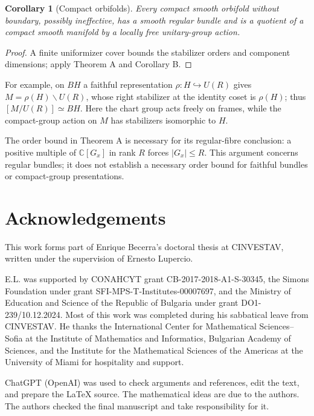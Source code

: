 \documentclass[11pt,a4paper,reqno]{amsart}
\numberwithin{equation}{section}
\newtheorem{corollary}[theorem]{Corollary}
\theoremstyle{remark}
\theoremstyle{plain}
\newcommand{\C}{\mathbb C}
\begin{document}
\begin{corollary}[Compact orbifolds]
Every compact smooth orbifold without boundary, possibly ineffective, has a
smooth regular bundle and is a quotient of a compact smooth manifold by a
locally free unitary-group action.
\end{corollary}

\begin{proof}
A finite uniformizer cover bounds the stabilizer orders and component
dimensions; apply Theorem A and Corollary B.
\end{proof}

For example, on $BH$ a faithful representation
$\rho:H\hookrightarrow U(R)$ gives $M=\rho(H)\backslash U(R)$, whose right
stabilizer at the identity coset is $\rho(H)$; thus
$[M/U(R)]\simeq BH$. Here the chart group acts freely on frames, while the compact-group action
on $M$ has stabilizers isomorphic to $H$.

The order bound in Theorem A is necessary for its regular-fibre conclusion:
a positive multiple of $\C[G_x]$ in rank $R$ forces $|G_x|\leq R$. This argument concerns regular bundles; it does not establish a necessary
order bound for faithful bundles or compact-group presentations.

\section*{Acknowledgements}
This work forms part of Enrique Becerra's doctoral thesis at CINVESTAV, written
under the supervision of Ernesto Lupercio.

E.L. was supported by CONAHCYT grant CB-2017-2018-A1-S-30345, the Simons
Foundation under grant SFI-MPS-T-Institutes-00007697, and the Ministry of
Education and Science of the Republic of Bulgaria under grant
DO1-239/10.12.2024. Most of this work was completed during his sabbatical leave
from CINVESTAV\@. He thanks the International Center for Mathematical
Sciences--Sofia at the Institute of Mathematics and Informatics, Bulgarian
Academy of Sciences, and the Institute for the Mathematical Sciences of the
Americas at the University of Miami for hospitality and support.

\begin{samepage}
ChatGPT (OpenAI) was used to check arguments and references, edit the text,
and prepare the LaTeX source. The mathematical ideas are due to the authors.
The authors checked the final manuscript and take responsibility for it.
\par
\end{samepage}



\end{document}
